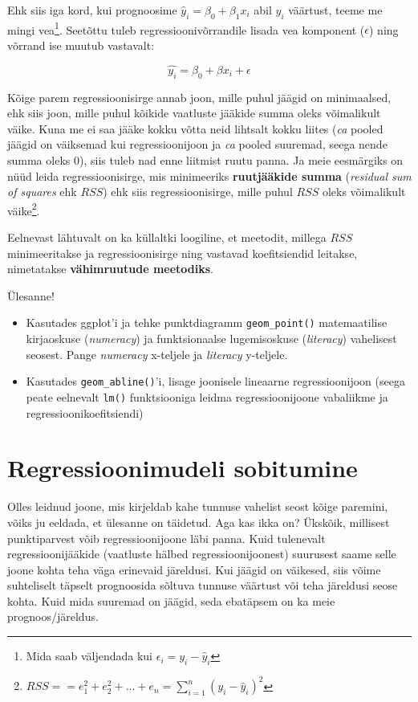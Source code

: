 \documentclass[
]{book}
\providecommand{\tightlist}{%
  \setlength{\itemsep}{0pt}\setlength{\parskip}{0pt}}
\begin{document}
Ehk siis iga kord, kui prognoosime \(\hat{y}_i=\beta_0+\beta_1x_i\) abil \(y_i\) väärtust, teeme me mingi vea\footnote{Mida saab väljendada kui \(\epsilon_i=y_i-\hat{y}_i\)}. Seetõttu tuleb regressioonivõrrandile lisada vea komponent (\(\epsilon\)) ning võrrand ise muutub vastavalt:

\begin{equation}
  \hat{y_i}=\beta_0+\beta x_i+\epsilon
\end{equation}

Kõige parem regressioonisirge annab joon, mille puhul jäägid on minimaalsed, ehk siis joon, mille puhul kõikide vaatluste jääkide summa oleks võimalikult väike. Kuna me ei saa jääke kokku võtta neid lihtsalt kokku liites (\emph{ca} pooled jäägid on väiksemad kui regressioonijoon ja \emph{ca} pooled suuremad, seega nende summa oleks \(0\)), siis tuleb nad enne liitmist ruutu panna. Ja meie eesmärgiks on nüüd leida regressioonisirge, mis minimeeriks \textbf{ruutjääkide summa} (\emph{residual sum of squares} ehk \(RSS\)) ehk siis regressioonisirge, mille puhul \(RSS\) oleks võimalikult väike\footnote{\(RSS= = e_1^2 + e_2^2 + ... + e_n = \sum_{i=1}^{n}(y_i-\hat{y}_i)^2\)}.

Eelnevast lähtuvalt on ka küllaltki loogiline, et meetodit, millega \(RSS\) minimeeritakse ja regressioonisirge ning vastavad koefitsiendid leitakse, nimetatakse \textbf{vähimruutude meetodiks}.

Ülesanne!

\begin{itemize}
\tightlist
\item
  Kasutades ggplot'i ja tehke punktdiagramm \texttt{geom\_point()} matemaatilise kirjaoskuse (\emph{numeracy}) ja funktsionaalse lugemisoskuse (\emph{literacy}) vahelisest seosest. Pange \emph{numeracy} x-teljele ja \emph{literacy} y-teljele.\\
\item
  Kasutades \texttt{geom\_abline()}'i, lisage joonisele lineaarne regressioonijoon (seega peate eelnevalt \texttt{lm()} funktsiooniga leidma regressioonijoone vabaliikme ja regressioonikoefitsiendi)
\end{itemize}

\hypertarget{regressioonimudeli-sobitumine}{%
\section{Regressioonimudeli sobitumine}\label{regressioonimudeli-sobitumine}}

Olles leidnud joone, mis kirjeldab kahe tunnuse vahelist seost kõige paremini, võiks ju eeldada, et ülesanne on täidetud. Aga kas ikka on? Ükskõik, millisest punktiparvest võib regressioonijoone läbi panna. Kuid tulenevalt regressioonijääkide (vaatluste hälbed regressioonijoonest) suurusest saame selle joone kohta teha väga erinevaid järeldusi. Kui jäägid on väikesed, siis võime suhteliselt täpselt prognoosida sõltuva tunnuse väärtust või teha järeldusi seose kohta. Kuid mida suuremad on jäägid, seda ebatäpsem on ka meie prognoos/järeldus.
\end{document}
